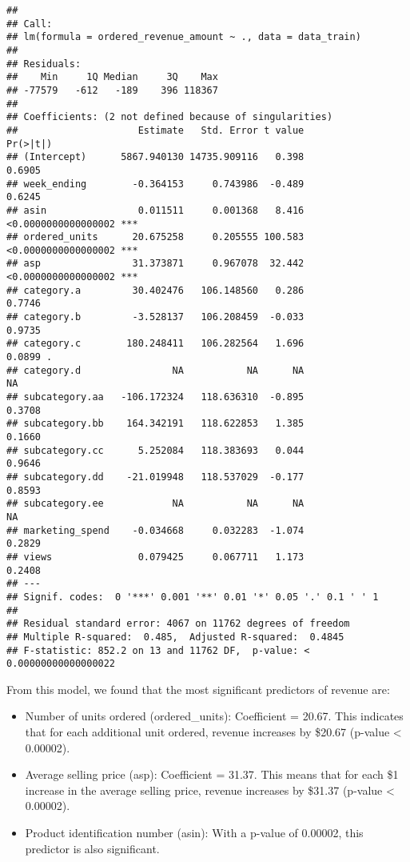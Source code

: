 \documentclass[
]{article}
\begin{document}
\begin{verbatim}
## 
## Call:
## lm(formula = ordered_revenue_amount ~ ., data = data_train)
## 
## Residuals:
##    Min     1Q Median     3Q    Max 
## -77579   -612   -189    396 118367 
## 
## Coefficients: (2 not defined because of singularities)
##                     Estimate   Std. Error t value            Pr(>|t|)    
## (Intercept)      5867.940130 14735.909116   0.398              0.6905    
## week_ending        -0.364153     0.743986  -0.489              0.6245    
## asin                0.011511     0.001368   8.416 <0.0000000000000002 ***
## ordered_units      20.675258     0.205555 100.583 <0.0000000000000002 ***
## asp                31.373871     0.967078  32.442 <0.0000000000000002 ***
## category.a         30.402476   106.148560   0.286              0.7746    
## category.b         -3.528137   106.208459  -0.033              0.9735    
## category.c        180.248411   106.282564   1.696              0.0899 .  
## category.d                NA           NA      NA                  NA    
## subcategory.aa   -106.172324   118.636310  -0.895              0.3708    
## subcategory.bb    164.342191   118.622853   1.385              0.1660    
## subcategory.cc      5.252084   118.383693   0.044              0.9646    
## subcategory.dd    -21.019948   118.537029  -0.177              0.8593    
## subcategory.ee            NA           NA      NA                  NA    
## marketing_spend    -0.034668     0.032283  -1.074              0.2829    
## views               0.079425     0.067711   1.173              0.2408    
## ---
## Signif. codes:  0 '***' 0.001 '**' 0.01 '*' 0.05 '.' 0.1 ' ' 1
## 
## Residual standard error: 4067 on 11762 degrees of freedom
## Multiple R-squared:  0.485,  Adjusted R-squared:  0.4845 
## F-statistic: 852.2 on 13 and 11762 DF,  p-value: < 0.00000000000000022
\end{verbatim}

From this model, we found that the most significant predictors of
revenue are:

\begin{itemize}
\item
  Number of units ordered (ordered\_units): Coefficient = 20.67. This
  indicates that for each additional unit ordered, revenue increases by
  \$20.67 (p-value \textless{} 0.00002).
\item
  Average selling price (asp): Coefficient = 31.37. This means that for
  each \$1 increase in the average selling price, revenue increases by
  \$31.37 (p-value \textless{} 0.00002).
\item
  Product identification number (asin): With a p-value of 0.00002, this
  predictor is also significant.
\end{itemize}
\end{document}
